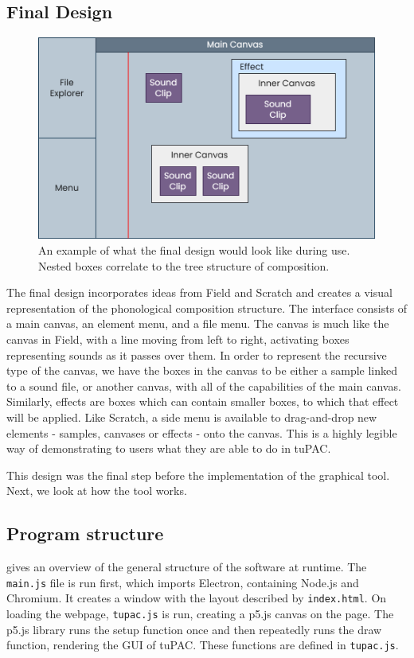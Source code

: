 \documentclass[12pt,a4paper,oneside,openright]{report}
\begin{document}
\newpage
\subsection{Final Design}\label{sec:final_design}
\begin{figure}[h]
    \centering
    \includegraphics[scale=0.4]{images/final_design.png}
    \caption{An example of what the final design would look like during use. Nested boxes correlate to the tree structure of composition.}
    \label{fig:final_design}
\end{figure}

The final design incorporates ideas from Field and Scratch and creates a visual representation of the phonological composition structure. The interface consists of a main canvas, an element menu, and a file menu. The canvas is much like the canvas in Field, with a line moving from left to right, activating boxes representing sounds as it passes over them. In order to represent the recursive type of the canvas, we have the boxes in the canvas to be either a sample linked to a sound file, or another canvas, with all of the capabilities of the main canvas. Similarly, effects are boxes which can contain smaller boxes, to which that effect will be applied. Like Scratch, a side menu is available to drag-and-drop new elements - samples, canvases or effects - onto the canvas. This is a highly legible way of demonstrating to users what they are able to do in tuPAC.

This design was the final step before the implementation of the graphical tool. Next, we look at how the tool works.

\subsection{Program structure}
 gives an overview of the general structure of the software at runtime. The \verb|main.js| file is run first, which imports Electron, containing Node.js and Chromium. It creates a window with the layout described by \verb|index.html|. On loading the webpage, \verb|tupac.js| is run, creating a p5.js canvas on the page. The p5.js library runs the setup function once and then repeatedly runs the draw function, rendering the GUI of tuPAC. These functions are defined in \verb|tupac.js|.
\end{document}
